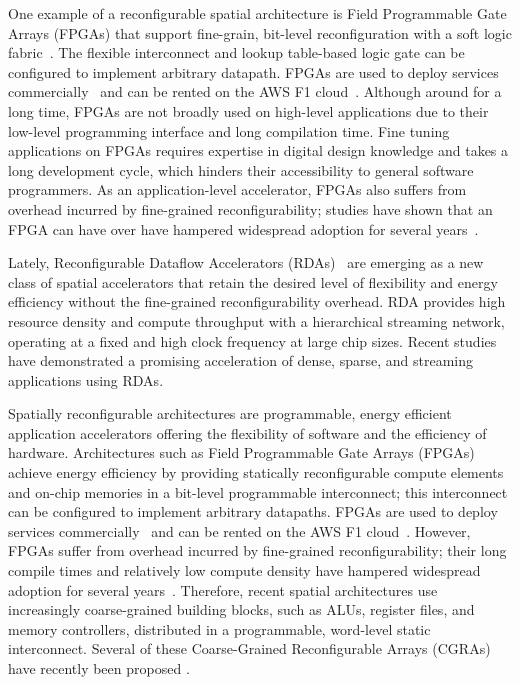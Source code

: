 One example of a reconfigurable spatial architecture is Field Programmable Gate Arrays (FPGAs) that support fine-grain, 
bit-level reconfiguration with a soft logic fabric~\cite{fpga-survey}.
The flexible interconnect and lookup table-based logic gate can be configured to implement arbitrary
datapath.
FPGAs are used to deploy services commercially~\cite{microsoft, baidu, deephi} and can be rented on the AWS F1 cloud~\cite{aws}. 
Although around for a long time, FPGAs are not broadly used on high-level applications due to their low-level 
programming interface and long compilation time.
Fine tuning applications on FPGAs requires expertise in digital design knowledge and takes a long
development cycle, which hinders their accessibility to general software programmers.
As an application-level accelerator, FPGAs also suffers from overhead incurred by fine-grained reconfigurability; 
studies have shown that an FPGA can have over 
have hampered widespread adoption for several 
years~\cite{bolsens, calhoun, fpgaPower, fpgaSurvey}. 

Lately, Reconfigurable Dataflow Accelerators (RDAs)~\cite{plasticine, ti} are emerging as a new class of spatial accelerators that retain the desired level of flexibility and energy efficiency without the fine-grained reconfigurability overhead.
RDA provides high resource density and compute throughput with a hierarchical streaming network, operating at a fixed and high clock frequency at large chip sizes.
Recent studies~\cite{plasticine} have demonstrated a promising acceleration of dense, sparse, and streaming applications using RDAs.

Spatially reconfigurable architectures are programmable, energy efficient application accelerators offering the flexibility of software and the efficiency of hardware.
Architectures such as Field Programmable Gate Arrays (FPGAs) achieve energy efficiency by providing statically reconfigurable compute elements and on-chip memories in a bit-level programmable interconnect; this interconnect can be configured to implement arbitrary datapaths. 
FPGAs are used to deploy services commercially~\cite{microsoft, baidu, deephi}
and can be rented on the AWS F1 cloud~\cite{aws}. 
However, FPGAs suffer from overhead incurred by fine-grained reconfigurability; their long compile times
and relatively low compute density have hampered widespread adoption for several years~\cite{bolsens, calhoun, fpgaPower, fpgaSurvey}. 
Therefore, recent spatial architectures use
increasingly coarse-grained building blocks, such as ALUs, register files, and memory controllers, distributed in a programmable, word-level static interconnect.
Several of these Coarse-Grained Reconfigurable Arrays (CGRAs) have recently been proposed \cite{adres, kress, dyser, piperench, tartan, hrl, ti, hycube, plasticine}.

